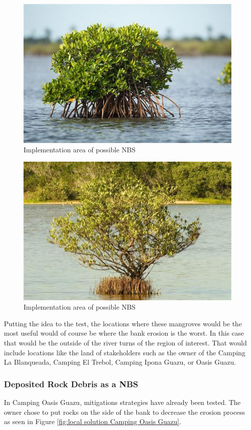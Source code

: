\begin{figure}[H]
    \centering
    \includegraphics[width=0.75\linewidth]{figures/ch8/mangrove1.jpeg}
    \caption{Implementation area of possible NBS}
    \label{fig:Rhizophora mangle}
\end{figure}

\begin{figure}[H]
    \centering
    \includegraphics[width=0.75\linewidth]{figures/ch8/mangrove2.jpeg}
    \caption{Implementation area of possible NBS}
    \label{fig:Avicennia germinans}
\end{figure}

Putting the idea to the test, the locations where these mangroves would be the most useful would of course be where the bank erosion is the worst. In this case that would be the outside of the river turns of the region of interest. That would include locations like the land of stakeholders such as the owner of the Camping La Blanqueada, Camping El Trebol, Camping Ipona Guazu, or Oasis Guazu. 

\subsubsection{Deposited Rock Debris as a NBS}
In Camping Oasis Guazu, mitigations strategies have already been tested. The owner chose to put rocks on the side of the bank to decrease the erosion process as seen in Figure \ref{fig:local solution Camping Oasis Guazu}.

